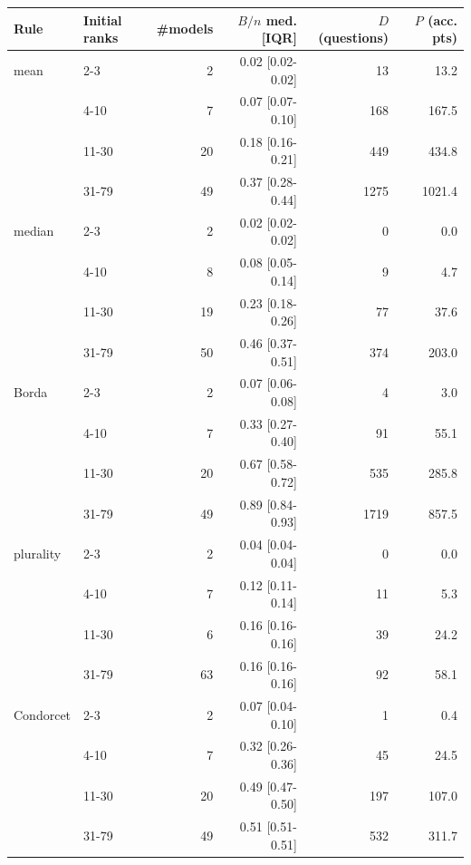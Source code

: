 \begin{tabular}{@{}llrrrr@{}}\toprule
Rule & Initial ranks & \#models & $B/n$ med. [IQR] & $D$ (questions) & $P$ (acc. pts)\\\midrule
mean & 2-3 & 2 & 0.02 [0.02-0.02] & 13 & 13.2\\
 & 4-10 & 7 & 0.07 [0.07-0.10] & 168 & 167.5\\
 & 11-30 & 20 & 0.18 [0.16-0.21] & 449 & 434.8\\
 & 31-79 & 49 & 0.37 [0.28-0.44] & 1275 & 1021.4\\
\midrule
median & 2-3 & 2 & 0.02 [0.02-0.02] & 0 & 0.0\\
 & 4-10 & 8 & 0.08 [0.05-0.14] & 9 & 4.7\\
 & 11-30 & 19 & 0.23 [0.18-0.26] & 77 & 37.6\\
 & 31-79 & 50 & 0.46 [0.37-0.51] & 374 & 203.0\\
\midrule
Borda & 2-3 & 2 & 0.07 [0.06-0.08] & 4 & 3.0\\
 & 4-10 & 7 & 0.33 [0.27-0.40] & 91 & 55.1\\
 & 11-30 & 20 & 0.67 [0.58-0.72] & 535 & 285.8\\
 & 31-79 & 49 & 0.89 [0.84-0.93] & 1719 & 857.5\\
\midrule
plurality & 2-3 & 2 & 0.04 [0.04-0.04] & 0 & 0.0\\
 & 4-10 & 7 & 0.12 [0.11-0.14] & 11 & 5.3\\
 & 11-30 & 6 & 0.16 [0.16-0.16] & 39 & 24.2\\
 & 31-79 & 63 & 0.16 [0.16-0.16] & 92 & 58.1\\
\midrule
Condorcet & 2-3 & 2 & 0.07 [0.04-0.10] & 1 & 0.4\\
 & 4-10 & 7 & 0.32 [0.26-0.36] & 45 & 24.5\\
 & 11-30 & 20 & 0.49 [0.47-0.50] & 197 & 107.0\\
 & 31-79 & 49 & 0.51 [0.51-0.51] & 532 & 311.7\\
\bottomrule\end{tabular}
